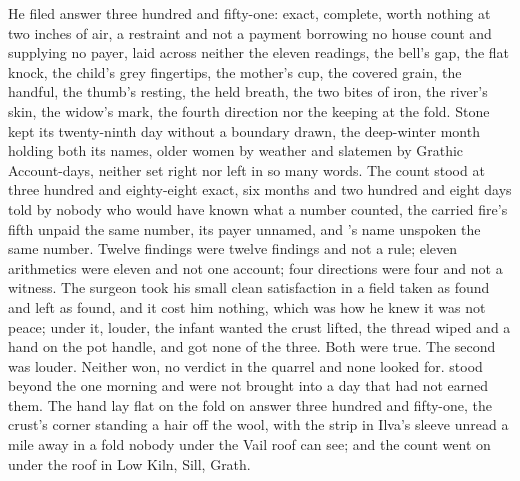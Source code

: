 He filed answer three hundred and fifty-one: exact, complete, worth nothing at two inches of air, a restraint and not a payment borrowing no house count and supplying no payer, laid across neither the eleven readings, the bell's gap, the flat knock, the child's grey fingertips, the mother's cup, the covered grain, the handful, the thumb's resting, the held breath, the two bites of iron, the river's skin, the widow's mark, the fourth direction nor the keeping at the fold. Stone kept its twenty-ninth day without a boundary drawn, the deep-winter month holding both its names, older women by weather and slatemen by Grathic Account-days, neither set right nor left in so many words. The count stood at three hundred and eighty-eight exact, six months and two hundred and eight days told by nobody who would have known what a number counted, the carried fire's fifth unpaid the same number, its payer unnamed, and 's name unspoken the same number. Twelve findings were twelve findings and not a rule; eleven arithmetics were eleven and not one account; four directions were four and not a witness. The surgeon took his small clean satisfaction in a field taken as found and left as found, and it cost him nothing, which was how he knew it was not peace; under it, louder, the infant wanted the crust lifted, the thread wiped and a hand on the pot handle, and got none of the three. Both were true. The second was louder. Neither won, no verdict in the quarrel and none looked for.  stood beyond the one morning and were not brought into a day that had not earned them. The hand lay flat on the fold on answer three hundred and fifty-one, the crust's corner standing a hair off the wool, with the strip in Ilva's sleeve unread a mile away in a fold nobody under the Vail roof can see; and the count went on under the roof in Low Kiln, Sill, Grath.
